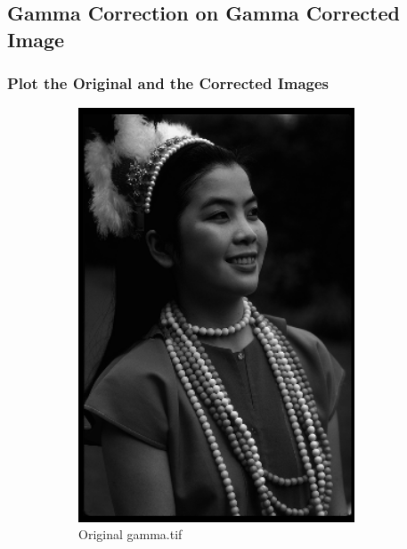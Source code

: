 \documentclass{article}
\begin{document}
\subsection{Gamma Correction on Gamma Corrected Image}
	\subsubsection{Plot the Original and the Corrected Images}
		\begin{figure}[h]
			\begin{subfigure}{0.5\textwidth}
				\includegraphics[width=0.9\textwidth]{gamma15.png}
				\caption{Original gamma.tif}
			\end{subfigure}
			\begin{subfigure}{0.5\textwidth}

\end{subfigure}
\end{figure}
\end{document}
